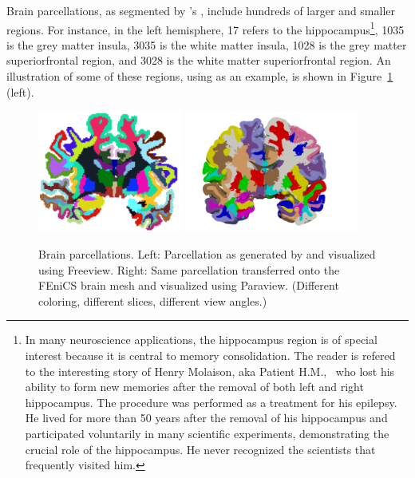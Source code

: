 Brain parcellations, as segmented by {\freesurfer}'s ,
include hundreds of larger and smaller regions. For instance, in the
left hemisphere, 17 refers to the hippocampus\footnote{In many
  neuroscience applications, the hippocampus region is of special
  interest because it is central to memory consolidation. The reader
  is refered to the interesting story of Henry Molaison, aka Patient
  H.M.,~\cite{squire2009legacy, scoville1957loss} who lost his ability
  to form new memories after the removal of both left and right
  hippocampus. The procedure was performed as a treatment for his
  epilepsy. He lived for more than 50 years after the removal of his
  hippocampus and participated voluntarily in many scientific
  experiments, demonstrating the crucial role of the hippocampus. He
  never recognized the scientists that frequently visited him.}, 1035
is the grey matter insula, 3035 is the white matter insula, 1028 is
the grey matter superiorfrontal region, and 3028 is the white matter
superiorfrontal region. An illustration of some of these regions,
using  as an example, is shown in
Figure~\ref{fig:chp4:freesurfer-parc} (left).

\begin{figure}
\begin{center}
  \hspace{2em}
  \includegraphics[height=4cm]{./chapters/chp4/FIG/parcellation-coronalwhiteBG_2.png}
  \includegraphics[height=4cm]{./chapters/chp4/FIG/ernie32-parcellation-basic.png}
  \caption{Brain parcellations. Left: Parcellation as generated
    by \freesurfer{} and visualized using Freeview. Right: Same
    parcellation transferred onto the FEniCS brain mesh and visualized
    using Paraview. (Different coloring, different slices, different view angles.)}
  \label{fig:chp4:freesurfer-parc}
\end{center}
\end{figure}

